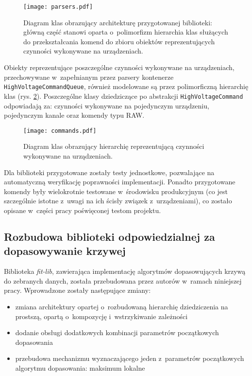 \begin{figure}[H]
\centering
\texttt{[image: parsers.pdf]}
\caption{Diagram klas obrazujący architekturę przygotowanej biblioteki: główną część stanowi oparta o~polimorfizm hierarchia klas służących do przekształcania komend do zbioru obiektów reprezentujących czynności wykonywane na urządzeniach. }
\label{fig:psu_parsers}
\end{figure}

Obiekty reprezentujące poszczególne czynności wykonywane na urządzeniach, przechowywane w~zapełnianym przez parsery kontenerze \lstinline{HighVoltageCommandQueue}, również modelowane są przez polimorficzną hierarchię klas (rys. \ref{fig:psu_commands}). Poszczególne klasy dziedziczące po abstrakcji \lstinline{HighVoltageCommand} odpowiadają za: czynności wykonywane na pojedynczym urządzeniu, pojedynczym kanale oraz komendy typu RAW.

\begin{figure}[H]
\centering
\texttt{[image: commands.pdf]}
\caption{Diagram klas obrazujący hierarchię reprezentującą czynności wykonywane na urządzeniach.}
\label{fig:psu_commands}
\end{figure}

Dla biblioteki przygotowane zostały testy jednostkowe, pozwalające na automatyczną weryfikację poprawności implementacji. Ponadto przygotowane komendy były wielokrotnie testowane w~środowisku produkcyjnym (co jest szczególnie istotne z~uwagi na ich ścisły związek z~urządzeniami), co zostało opisane w~części pracy poświęconej testom projektu.

\subsection{Rozbudowa biblioteki odpowiedzialnej za dopasowywanie krzywej}
Biblioteka \emph{fit-lib}, zawierająca implementację algorytmów dopasowujących krzywą do zebranych danych, została przebudowana przez autorów w~ramach niniejszej pracy. Wprowadzone zostały następujące zmiany:
\begin{itemize}
    \item zmiana architektury opartej o~rozbudowaną hierarchię dziedziczenia na prostszą, opartą o~kompozycję i~wstrzykiwanie zależności
    \item dodanie obsługi dodatkowych kombinacji parametrów początkowych dopasowania
    \item przebudowa mechanizmu wyznaczającego jeden z~parametrów początkowych algorytmu dopasowania: maksimum lokalne 
\end{itemize}

